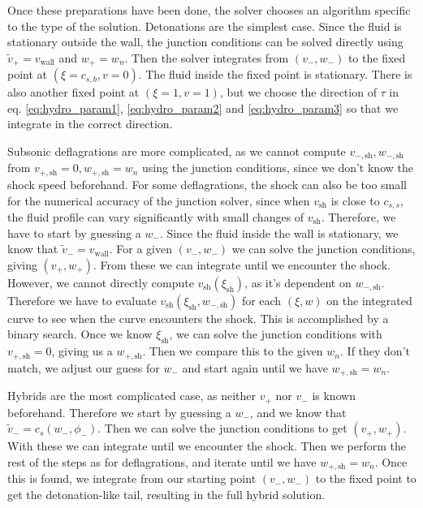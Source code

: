 Once these preparations have been done,
the solver chooses an algorithm specific to the type of the solution.
Detonations are the simplest case.
Since the fluid is stationary outside the wall,
the junction conditions can be solved directly using
$\tilde{v}_+ = v_\text{wall}$ and $w_+ = w_n$.
Then the solver integrates from $(v_-, w_-)$ to the fixed point at $(\xi=c_{s,b}, v=0)$.
The fluid inside the fixed point is stationary.
There is also another fixed point at $(\xi=1, v=1)$, but we choose the direction of $\tau$ in eq. \eqref{eq:hydro_param1}, \eqref{eq:hydro_param2} and \eqref{eq:hydro_param3} so that we integrate in the correct direction.

Subsonic deflagrations are more complicated,
as we cannot compute $v_{-,\text{sh}}, w_{-,\text{sh}}$ from $v_{+,\text{sh}}=0, w_{+,\text{sh}}=w_n$ using the junction conditions,
since we don't know the shock speed beforehand.
For some deflagrations, the shock can also be too small for the numerical accuracy of the junction solver,
since when $v_\text{sh}$ is close to $c_{s,s}$, the fluid profile can vary significantly with small changes of $v_\text{sh}$.
Therefore, we have to start by guessing a $w_-$.
Since the fluid inside the wall is stationary, we know that $\tilde{v}_- = v_{\text{wall}}$.
For a given $(v_-, w_-)$ we can solve the junction conditions, giving $(v_+, w_+)$.
From these we can integrate until we encounter the shock.
However, we cannot directly compute $v_\text{sh}(\xi_\text{sh})$, as it's dependent on $w_{-,\text{sh}}$.
Therefore we have to evaluate $v_\text{sh}(\xi_\text{sh}, w_{-,\text{sh}})$ for each $(\xi, w)$ on the integrated curve to see
when the curve encounters the shock.
This is accomplished by a binary search.
Once we know $\xi_\text{sh}$, we can solve the junction conditions with $v_{+,\text{sh}} = 0$, giving us a $w_{+,\text{sh}}$.
Then we compare this to the given $w_n$.
If they don't match, we adjust our guess for $w_-$ and start again until we have $w_{+,\text{sh}} = w_n$.

Hybrids are the most complicated case, as neither $v_+$ nor $v_-$ is known beforehand.
Therefore we start by guessing a $w_-$, and we know that $\tilde{v}_- = c_s(w_-, \phi_-)$.
Then we can solve the junction conditions to get $(v_+, w_+)$.
With these we can integrate until we encounter the shock.
Then we perform the rest of the steps as for deflagrations, and iterate until we have $w_{+,\text{sh}} = w_n$.
Once this is found, we integrate from our starting point $(v_-, w_-)$ to the fixed point to get the detonation-like tail,
resulting in the full hybrid solution.

